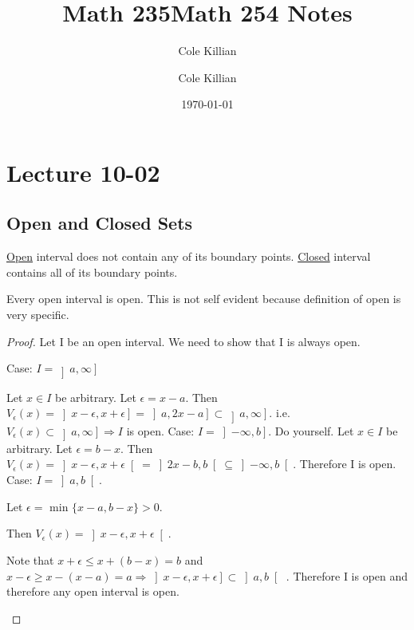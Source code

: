 \documentclass[11pt]{scrartcl}
\title{Math 235}
\date{\today}
\author{Cole Killian}
\begin{document}
\title{Math 254 Notes}
\author{Cole Killian}

\maketitle

\section{Lecture 10-02}

\subsection{Open and Closed Sets}

\begin{definition}
  \ul{Open} interval does not contain any of its boundary points.
  \ul{Closed} interval contains all of its boundary points.
\end{definition}

\begin{theorem}
  Every open interval is open. This is not self evident because definition of open is very specific.
  \begin{proof}Let I be an open interval. We need to show that I is always open.
    \begin{enumerate}
      \ii
      Case: $I = \left]a, \infty \right]$

      Let $x \in I$ be arbitrary. Let $\epsilon = x - a$. Then $V_\epsilon(x) = \left]x - \epsilon, x + \epsilon\right] = \left]a, 2x - a\right] \subset \left]a, \infty\right]$. i.e. $V_\epsilon(x) \subset \left]a, \infty\right] \Rightarrow I$ is open.
      \ii
      Case: $I = \left]-\infty, b\right]$. Do yourself. Let $x \in I$ be arbitrary. Let $\epsilon = b - x$. Then $V_\epsilon(x) = \left]x - \epsilon, x + \epsilon\right[ = \left]2x - b, b\right[ \subseteq \left]-\infty, b\right[$. Therefore I is open.
      \ii
      Case: $I = \left]a, b\right[$.

      Let  $\epsilon = $ min $\{x - a, b - x\} > 0$.

      Then $V_\epsilon(x) = \left]x - \epsilon, x + \epsilon\right[$.

      Note that $x + \epsilon \leq x + (b - x) = b$ and $x - \epsilon \geq x - (x - a) = a \Rightarrow \left]x - \epsilon, x + \epsilon\right] \subset \left]a, b\right[$ . Therefore I is open and therefore any open interval is open.
    \end{enumerate}
  \end{proof}
\end{theorem}
\end{document}
